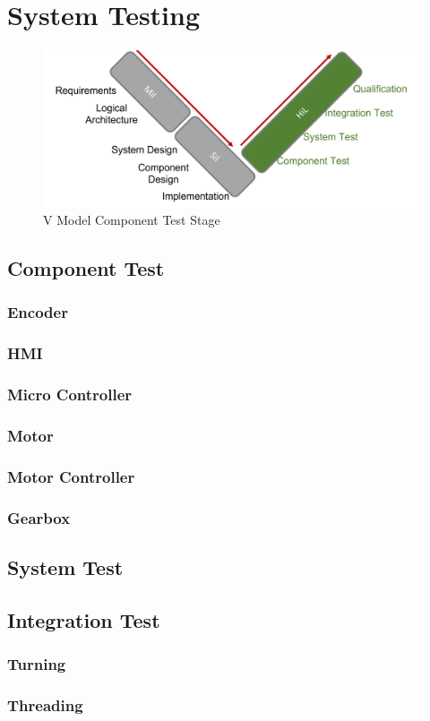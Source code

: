 \section{System Testing}
\begin{figure}[h!]
    \begin{center}
    \includegraphics[width=12cm]{Pictures/V Model Component Test.png}
    \caption[V Model Component Test]{V Model Component Test Stage}
    \label{V Model Component Test}
    \end{center}
\end{figure}
\subsection{Component Test}
\subsubsection{Encoder}
\subsubsection{HMI}
\subsubsection{Micro Controller}
\subsubsection{Motor}
\subsubsection{Motor Controller}
\subsubsection{Gearbox}

\subsection{System Test}

\subsection{Integration Test}
\subsubsection{Turning}
\subsubsection{Threading}













